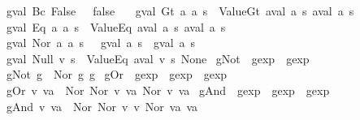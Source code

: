 \begin{isabellebody}
\ \ {\isachardoublequoteopen}gval\ {\isacharparenleft}Bc\ False{\isacharparenright}\ {\isacharunderscore}\ {\isacharequal}\ false{\isachardoublequoteclose}\ {\isacharbar}\isanewline
\ \ {\isachardoublequoteopen}gval\ {\isacharparenleft}Gt\ a\ a\ s\ {\isacharequal}\ ValueGt\ {\isacharparenleft}aval\ a\ s{\isacharparenright}\ {\isacharparenleft}aval\ a\ s{\isacharparenright}{\isachardoublequoteclose}\ {\isacharbar}\isanewline
\ \ {\isachardoublequoteopen}gval\ {\isacharparenleft}Eq\ a\ a\ s\ {\isacharequal}\ ValueEq\ {\isacharparenleft}aval\ a\ s{\isacharparenright}\ {\isacharparenleft}aval\ a\ s{\isacharparenright}{\isachardoublequoteclose}\ {\isacharbar}\isanewline
\ \ {\isachardoublequoteopen}gval\ {\isacharparenleft}Nor\ a\ a\ s\ {\isacharequal}\ {\isasymnot}\isactrlsub {\isacharquery}\ {\isacharparenleft}{\isacharparenleft}gval\ a\ s{\isacharparenright}\ {\isasymor}\isactrlsub {\isacharquery}\ {\isacharparenleft}gval\ a\ s{\isacharparenright}{\isacharparenright}{\isachardoublequoteclose}\ {\isacharbar}\isanewline
\ \ {\isachardoublequoteopen}gval\ {\isacharparenleft}Null\ v{\isacharparenright}\ s\ {\isacharequal}\ ValueEq\ {\isacharparenleft}aval\ v\ s{\isacharparenright}\ None{\isachardoublequoteclose}\isanewline
\isanewline
{}\isamarkupfalse%
\ gNot\ {\isacharcolon}{\isacharcolon}\ {\isachardoublequoteopen}gexp\ {\isasymRightarrow}\ gexp{\isachardoublequoteclose}\ \ \isanewline
\ \ {\isachardoublequoteopen}gNot\ g\ {\isasymequiv}\ Nor\ g\ g{\isachardoublequoteclose}\isanewline
\isanewline
{}\isamarkupfalse%
\ gOr\ {\isacharcolon}{\isacharcolon}\ {\isachardoublequoteopen}gexp\ {\isasymRightarrow}\ gexp\ {\isasymRightarrow}\ gexp{\isachardoublequoteclose}\ \ \isanewline
\ \ {\isachardoublequoteopen}gOr\ v\ va\ {\isasymequiv}\ Nor\ {\isacharparenleft}Nor\ v\ va{\isacharparenright}\ {\isacharparenleft}Nor\ v\ va{\isacharparenright}{\isachardoublequoteclose}\isanewline
\isanewline
{}\isamarkupfalse%
\ gAnd\ {\isacharcolon}{\isacharcolon}\ {\isachardoublequoteopen}gexp\ {\isasymRightarrow}\ gexp\ {\isasymRightarrow}\ gexp{\isachardoublequoteclose}\ \ \isanewline
\ \ {\isachardoublequoteopen}gAnd\ v\ va\ {\isasymequiv}\ Nor\ {\isacharparenleft}Nor\ v\ v{\isacharparenright}\ {\isacharparenleft}Nor\ va\ va{\isacharparenright}{\isachardoublequoteclose}\isanewline

\end{isabellebody}
